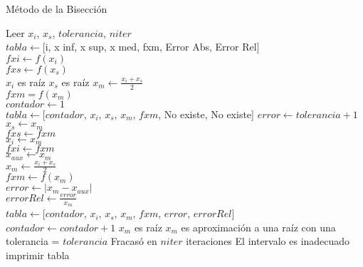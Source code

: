 \documentclass[12pt]{article}
\begin{document}
\begin{algorithm}[H]
	
	\caption{Método de la Bisección}
	\SetAlgoLined
	Leer $x_i$, $x_s$, $tolerancia$, $niter$ \\
	$tabla \leftarrow $[i, x inf, x sup, x med, fxm, Error Abs, Error Rel] \\
	$fxi \leftarrow f(x_i)$ \\
	$fxs \leftarrow f(x_s)$ \\
	{$x_i$ es raíz}
	{$x_s$ es raíz}
	{
		$x_m \leftarrow \frac{x_i + x_s}{2}$\\
		$fxm = f(x_m)$\\
		$contador \leftarrow 1$\\
		$tabla \leftarrow $[$contador$, $x_i$, $x_s$, $x_m$, $fxm$, No existe, No existe]
		$error \leftarrow tolerancia + 1$ \\
		{
			{$x_s \leftarrow x_m$\\
			$fxs \leftarrow fxm$\\}
			{$x_i \leftarrow x_m$\\
			$fxi \leftarrow fxm$\\}
			$x_{aux} \leftarrow x_m$\\
			$x_m \leftarrow \frac{x_i + x_s}{2}$\\
			$fxm \leftarrow f(x_m)$\\
			$error \leftarrow |x_m - x_{aux}|$\\
			$error Rel \leftarrow \frac{error}{x_m}$ \\
			$tabla \leftarrow $[$contador$, $x_i$, $x_s$, $x_m$, $fxm$, $error$, $error Rel$] \\
			$contador \leftarrow contador + 1$
		}
		{$x_m$ es raíz}
		{$x_m$ es aproximación a una raíz con una tolerancia = $tolerancia$}
		\Else
		{Fracasó en $niter$ iteraciones}
	}
	\Else
	{El intervalo es inadecuado}
	imprimir tabla

\end{algorithm}
\end{document}

